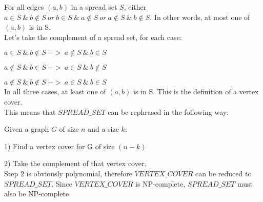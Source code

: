 
For all edges $(a,b)$ in a spread set $S$, either $a \in S\ \&\ b \notin S\ or\ b \in S\ \&\ a \notin S\ or\ a \notin S\ \&\ b \notin S$. In other words, at most one of $(a,b)$ is in S.\\

Let's take the complement of a spread set, for each case:

$a \in S\ \&\ b \notin S\ ->\ a \notin S\ \&\ b \in S$

$a \notin S\ \&\ b \in S\ ->\ a \in S\ \&\ b \notin S$

$a \notin S\ \&\ b \notin S\ ->\ a \in S\ \&\ b \in S$\\

In all three cases, at least one of $(a,b)$ is in S. This is the definition of a vertex cover.\\

This means that $SPREAD\_SET$ can be rephrased in the following way:

Given a graph $G$ of size $n$ and a size $k$:

1) Find a vertex cover for G of size $(n-k)$

2) Take the complement of that vertex cover.\\

Step 2 is obviously polynomial, therefore $VERTEX\_COVER$ can be reduced to $SPREAD\_SET$. Since $VERTEX\_COVER$ is NP-complete, $SPREAD\_SET$ must also be NP-complete
